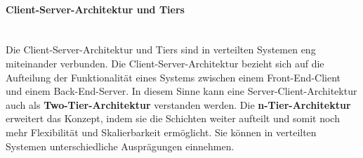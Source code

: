 \documentclass[../vs-script-first-v01.tex]{subfiles}
\begin{document}
\paragraph{Client-Server-Architektur und Tiers}\mbox{}\\
Die Client-Server-Architektur und Tiers sind in verteilten Systemen eng miteinander verbunden. Die Client-Server-Architektur bezieht sich auf die Aufteilung der Funktionalität eines Systems zwischen einem Front-End-Client und einem Back-End-Server. In diesem Sinne kann eine Server-Client-Architektur auch als \textbf{Two-Tier-Architektur} verstanden werden. Die \textbf{n-Tier-Architektur} erweitert das Konzept, indem sie die Schichten weiter aufteilt und somit noch mehr Flexibilität und Skalierbarkeit ermöglicht. Sie können in verteilten Systemen unterschiedliche Ausprägungen einnehmen.
\begin{itemize}


\end{itemize}
\end{document}
